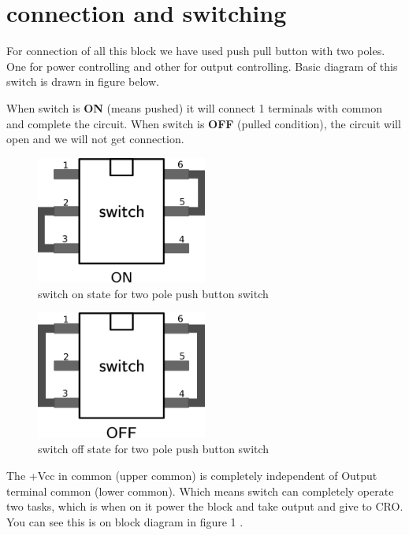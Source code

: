 \documentclass[12pt]{article}
\begin{document}
\section{connection and switching}
\label{sec:org4fb54f0}

For connection of all this block we have used push pull button with two poles. One for power controlling and other for output controlling. Basic diagram of this switch is drawn in figure below.

When switch is \textbf{\textbf{ON}} (means pushed) it will connect 1 terminals with common and complete the circuit. When switch is \textbf{\textbf{OFF}} (pulled condition), the circuit will open and we will not get connection.

\begin{figure}[H]
    \centering
    \label{switchon}
    \includegraphics[width=0.5\textwidth]{imgs/switchon.png}
    \caption{switch on state for two pole push button switch}
\end{figure}

\begin{figure}[H]
    \centering
    \label{switchoff}
    \includegraphics[width=0.5\textwidth]{imgs/switchoff.png}
    \caption{switch off state for two pole push button switch}
\end{figure}

The +Vcc in common (upper common) is completely independent of Output terminal common (lower common). Which means switch can completely operate two tasks, which is when on it power the block and take output and give to CRO. You can see this is on block diagram in figure 1 \label{orgca06335}.
\end{document}
